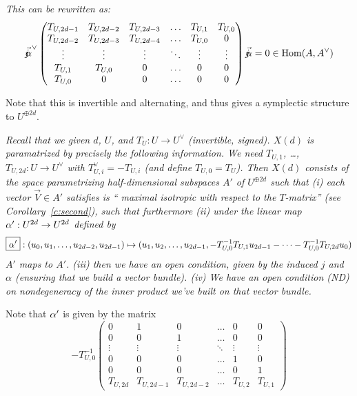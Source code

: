 { \label{c:second}
{\em This can be rewritten as:
  $$
 \vec{\mathord{j\mkern-7mu\alpha}}^\vee
 \begin{pmatrix}
T_{U,2d-1} & T_{U,2d-2} &  T_{U,2d-3} &  \hdots & T_{U,1} & T_{U,0} \\
 T_{U,2d-2} &  T_{U,2d-3} & T_{U,2d-4} &  \hdots & T_{U,0} & 0 \\
   \vdots  & \vdots  &   \vdots  & \ddots & \vdots & \vdots \\
   T_{U,1} & T_{U,0} & 0 & \hdots & 0 & 0 \\
   T_{U,0} & 0 & 0 & \hdots & 0 & 0 
  \end{pmatrix}
 \vec{\mathord{j\mkern-7mu\alpha}} =0 \in \operatorname{Hom}(A,A^\vee)
$$
}

Note that this  is invertible and alternating, and thus gives a symplectic structure to $U^{\oplus 2d}$.


  {\em Recall that we given $d$, $U$, and $T_U: U \rightarrow U^\vee$ (invertible, signed).
  $X(d)$ is paramatrized by precisely the following information.
 We need $T_{U,1}$, \dots, $T_{U,2d}: U \rightarrow U^\vee$ with $T_{U,i}^\vee = - T_{U,i}$ (and define $T_{U,0}=T_U$). Then $X(d)$ consists of the space parametrizing half-dimensional subspaces $\boxed{A'}$ of $U^{\oplus 2d}$ such that (i) each vector $\vec{V} \in A'$ satisfies is `` maximal isotropic with respect to the $T$-matrix'' 
 (see Corollary~\ref{c:second}), such that furthermore
(ii)  under the linear map $\alpha' : U^{2d} \rightarrow U^{2d}$ defined by  $$\boxed{\alpha'}: (u_0, u_1, \dots, u_{2d-2}, u_{2d-1}) \mapsto
 (u_1, u_2, \dots, u_{2d-1},
 -T^{-1}_{U,0} T_{U,1} u_{2d-1}  - \cdots  -T^{-1}_{U,0} T_{U,2d} u_0 )$$
 $A'$ maps to $A'$.  (iii) then we have an open condition, given by the induced $j$ and $\alpha$ (ensuring that we build a vector bundle). (iv)  We have an open condition (ND) on nondegeneracy of the inner product we've built on that vector bundle.
}

Note that $\alpha'$ is given by the matrix
$$ -T^{-1}_{U,0}
\begin{pmatrix}
  0 & 1  & 0 & \hdots &       0 &  0 \\
  0 & 0 &  1 & \hdots &       0 &  0 \\
\vdots & \vdots & \vdots & \ddots & \vdots & \vdots \\
  0 & 0 &  0 & \hdots &       1 &  0 \\
  0 & 0 &  0 & \hdots &       0 &  1 \\
 T_{U,2d} & T_{U,2d-1} & T_{U,2d-2} & \hdots & T_{U,2} & T_{U,1} 
  \end{pmatrix}
$$

}
